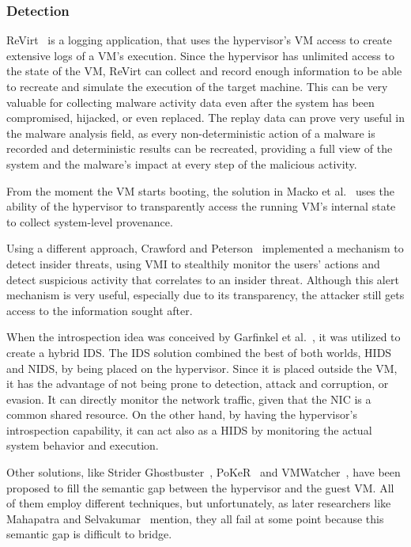 \subsubsection{Detection}

\par ReVirt~\cite{dunlap2002revirt} is a logging application, that uses the hypervisor’s \ac{VM} access to create extensive logs of a \ac{VM}’s execution. Since the hypervisor has unlimited access to the state of the \ac{VM}, ReVirt can collect and record enough information to be able to recreate and simulate the execution of the target machine. This can be very valuable for collecting malware activity data even after the system has been compromised, hijacked, or even replaced. The replay data can prove very useful in the malware analysis field, as every non-deterministic action of a malware is recorded and deterministic results can be recreated, providing a full view of the system and the malware's impact at every step of the malicious activity.

\par From the moment the \ac{VM} starts booting, the solution in Macko et al.~\cite{macko2011collecting} uses the ability of the hypervisor to transparently access the running \ac{VM}’s internal state to collect system-level provenance. 

\par Using a different approach, Crawford and Peterson~\cite{crawford2013insider} implemented a mechanism to detect insider threats, using \ac{VMI} to stealthily monitor the users' actions and detect suspicious activity that correlates to an insider threat. Although this alert mechanism is very useful, especially due to its transparency, the attacker still gets access to the information sought after.

\par When the introspection idea was conceived by Garfinkel et al.~\cite{garfinkel2003virtual}, it was utilized to create a hybrid \ac{IDS}. The \ac{IDS} solution combined the best of both worlds, \ac{HIDS} and \ac{NIDS}, by being placed on the hypervisor. Since it is placed outside the \ac{VM}, it has the advantage of not being prone to detection, attack and corruption, or evasion. It can directly monitor the network traffic, given that the \ac{NIC} is a common shared resource. On the other hand, by having the hypervisor’s introspection capability, it can act also as a \ac{HIDS} by monitoring the actual system behavior and execution. 

\par Other solutions, like Strider Ghostbuster~\cite{wang2005detecting}, PoKeR~\cite{riley2009multi} and VMWatcher~\cite{jiang2007stealthy}, have been proposed to fill the semantic gap between the hypervisor and the guest \ac{VM}. All of them employ different techniques, but unfortunately, as later researchers like Mahapatra and Selvakumar~\cite{mahapatra2011online} mention, they all fail at some point because this semantic gap is difficult to bridge. 

